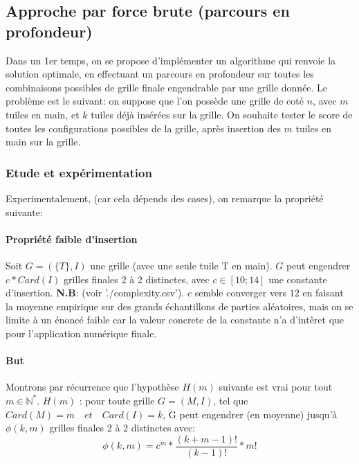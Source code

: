 \documentclass[10pt]{article}
\begin{document}
    \subsection{Approche par force brute (parcours en profondeur)}
      Dans un 1er temps, on se propose d'implémenter un algorithme qui renvoie la solution optimale, en effectuant un parcours en profondeur
      sur toutes les combinaisons possibles de grille finale engendrable par une grille donnée.
      \newline
      \newline
      Le problème est le suivant: on suppose que l'on possède une grille de coté $n$, avec $m$ tuiles en main, et $k$ tuiles déjà insérées sur la grille.
      On souhaite tester le score de toutes les configurations possibles de la grille, après insertion des $m$ tuiles en main sur la grille.
      \subsubsection{Etude et expérimentation}
	Experimentalement, (car cela dépends des cases), on remarque la propriété suivante:
	\paragraph{Propriété faible d'insertion}
	Soit $G = (\{T\}, I)$ une grille (avec une seule tuile T en main).
	\newline
	$G$ peut engendrer $\boxed{c * Card(I)}$ grilles finales 2 à 2 distinctes, avec $c \in [10;14]$ une constante d'insertion.
	\newline
	\textbf{N.B}: (voir './complexity.csv'). $c$ semble converger vers $12$ en faisant la moyenne empirique sur des grands échantillons
	de parties aléatoires, mais on se limite à un énoncé faible car la valeur concrete
	de la constante n'a d'intêret que pour l'application numérique finale.
	\paragraph{But} Montrons par récurrence que l'hypothèse $H(m)$ suivante est vrai pour tout $m \in \mathbb{N^*}$.
	\newline
	\newline
	$H(m)$ : pour toute grille $G=(M, I)$, tel que $Card(M) = m \quad et \quad Card(I) = k$,
	G peut engendrer (en moyenne) jusqu'à $\phi(k, m)$ grilles finales 2 à 2 distinctes avec:
	$$\boxed{\phi(k, m) = c^m * \frac{(k + m - 1)!}{(k - 1)!} * m!}$$
\end{document}
